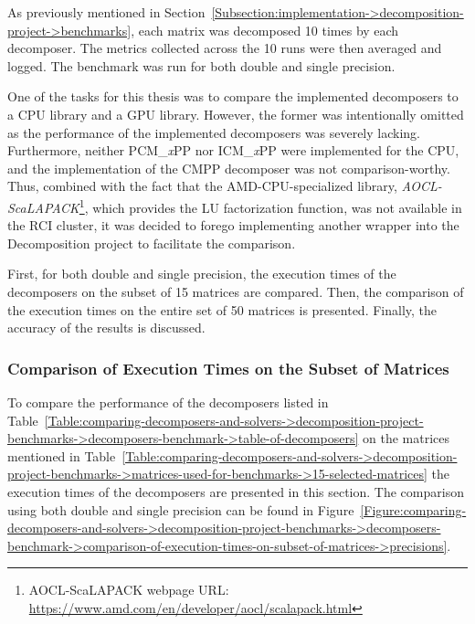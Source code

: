 As previously mentioned in Section~\ref{Subsection:implementation->decomposition-project->benchmarks}, each matrix was decomposed 10 times by each decomposer.
The metrics collected across the 10 runs were then averaged and logged.
The benchmark was run for both double and single precision.

One of the tasks for this thesis was to compare the implemented decomposers to a CPU library and a GPU library.
However, the former was intentionally omitted as the performance of the implemented decomposers was severely lacking.
Furthermore, neither PCM\_\textit{x}PP nor ICM\_\textit{x}PP were implemented for the CPU, and the implementation of the CMPP decomposer was not comparison-worthy.
Thus, combined with the fact that the AMD-CPU-specialized library, \textit{AOCL-ScaLAPACK}\footnote{AOCL-ScaLAPACK webpage URL: \url{https://www.amd.com/en/developer/aocl/scalapack.html}}, which provides the LU factorization function, was not available in the RCI cluster, it was decided to forego implementing another wrapper into the Decomposition project to facilitate the comparison.

First, for both double and single precision, the execution times of the decomposers on the subset of 15 matrices are compared.
Then, the comparison of the execution times on the entire set of 50 matrices is presented.
Finally, the accuracy of the results is discussed.


\subsubsection{Comparison of Execution Times on the Subset of Matrices}\label{Subsection:comparing-decomposers-and-solvers->decomposition-project-benchmarks->decomposers-benchmark->comparison-of-execution-times-on-subset-of-matrices}
To compare the performance of the decomposers listed in Table~\ref{Table:comparing-decomposers-and-solvers->decomposition-project-benchmarks->decomposers-benchmark->table-of-decomposers} on the matrices mentioned in Table~\ref{Table:comparing-decomposers-and-solvers->decomposition-project-benchmarks->matrices-used-for-benchmarks->15-selected-matrices} the execution times of the decomposers are presented in this section.
The comparison using both double and single precision can be found in Figure~\ref{Figure:comparing-decomposers-and-solvers->decomposition-project-benchmarks->decomposers-benchmark->comparison-of-execution-times-on-subset-of-matrices->precisions}.

